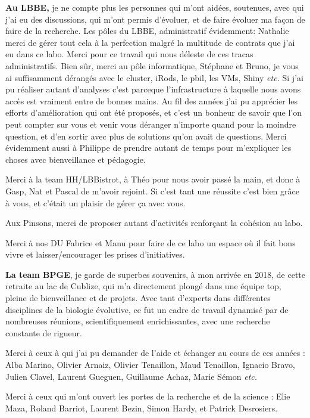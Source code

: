 \vspace*{7pt}
\textbf{Au LBBE,}
je ne compte plus les personnes qui m'ont aidées, soutenues, avec qui j'ai eu des discussions, qui m'ont permis d'évoluer, et de faire évoluer ma façon de faire de la recherche.
Les pôles du LBBE, administratif évidemment: Nathalie merci de gérer tout cela à la perfection malgré la multitude de contrats que j'ai eu dans ce labo. Merci pour ce travail qui nous déleste de ces tracas administratifs.
Bien sûr, merci au pôle informatique, Stéphane et Bruno, je vous ai suffisamment dérangés avec le cluster, iRods, le pbil, les VMs, Shiny \textit{etc.} Si j'ai pu réaliser autant d'analyses c'est parceque l'infrastructure à laquelle nous avons accès est vraiment entre de bonnes mains. Au fil des années j'ai pu apprécier les efforts d'amélioration qui ont été proposés, et c'est un bonheur de savoir que l'on peut compter sur vous et venir vous déranger n'importe quand pour la moindre question, et d'en sortir avec plus de solutions qu'on avait de questions. Merci évidemment aussi à Philippe de prendre autant de temps pour m'expliquer les choses avec bienveillance et pédagogie.

Merci à la team HH/LBBistrot, à Théo pour nous avoir passé la main, et donc à Gasp, Nat et Pascal de m'avoir rejoint. Si c'est tant une réussite c'est bien grâce à vous, et c'était un plaisir de gérer ça avec vous.

Aux Pinsons, merci de proposer autant d'activités renforçant la cohésion au labo.

Merci à nos DU Fabrice et Manu pour faire de ce labo un espace où il fait bons vivre et laisser/encourager les prises d'initiatives.

\textbf{La team BPGE}, je garde de superbes souvenirs, à mon arrivée en 2018, de cette retraite au lac de Cublize, qui m'a directement plongé dans une équipe top, pleine de bienveillance et de projets. Avec tant d'experts dans différentes disciplines de la biologie évolutive, ce fut un cadre de travail dynamisé par de nombreuses réunions, scientifiquement enrichissantes, avec une recherche constante de rigueur.

Merci à ceux à qui j'ai pu demander de l'aide et échanger au cours de ces années : Alba Marino, Olivier Arnaiz, Olivier Tenaillon, Maud Tenaillon, Ignacio Bravo, Julien Clavel, Laurent Gueguen, Guillaume Achaz, Marie Sémon \textit{etc.}

Merci à ceux qui m'ont ouvert les portes de la recherche et de la science : Elie Maza, Roland Barriot, Laurent Bezin, Simon Hardy, et Patrick Desrosiers.


